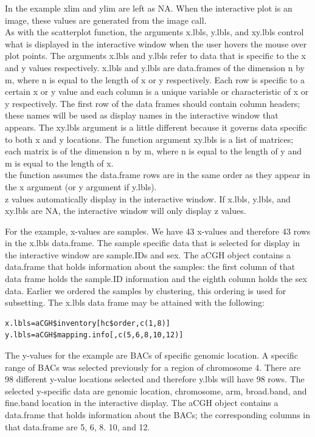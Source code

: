\documentclass[]{article}
\begin{document}
\indent In the example xlim and ylim are left as NA. When the interactive plot is an image, these values are generated from the image call. \\
\indent As with the scatterplot function, the arguments x.lbls, y.lbls, and xy.lbls control what is displayed in the interactive window when the user hovers the mouse over plot points. The arguments x.lbls and y.lbls refer to data that is specific to the x and y values respectively. x.lbls and y.lbls are data.frames of the dimension n by m, where n is equal to the length of x or y respectively. Each row is specific to a certain x or y value and each column is a unique variable or characteristic of x or y respectively.  The first row of the data frames should contain column headers; these names will be used as display names in the interactive window that appears. The xy.lbls argument is a little different because it governs data specific to both x and y locations. The function argument xy.lbls is a list of matrices; each matrix is of the dimension n by m, where n is equal to the length of y and m is equal to the length of x.\\ 

 the function assumes the data.frame rows are in the same order as they appear in the x argument (or y argument if y.lbls). \\
 z values automatically display in the interactive window. If x.lbls, y.lbls, and xy.lbls are NA, the interactive window will only display z values. \newline 

\indent For the example, x-values are samples. We have 43 x-values and therefore 43 rows in the x.lbls data.frame. The sample specific data that is selected for display in the interactive window are sample.IDs and sex. The aCGH object contains a data.frame that holds information about the samples: the first column of that data frame holds the sample.ID information and the eighth column holds the sex data. Earlier we ordered the samples by clustering, this ordering is used for subsetting. The x.lbls data frame may be attained with the following:

\begin{verbatim}
x.lbls=aCGH$inventory[hc$order,c(1,8)]
y.lbls=aCGH$mapping.info[,c(5,6,8,10,12)]
\end{verbatim}


\indent The y-values for the example are BACs of specific genomic location. A specific range of BACs was selected previously for a region of chromosome 4.  There are 98 different y-value locations selected and therefore y.lbls will have 98 rows. The selected y-specific data are genomic location, chromosome, arm, broad.band, and fine.band location in the interactive display. The aCGH object contains a data.frame that holds information about the BACs; the corresponding columns in that data.frame are 5, 6, 8. 10, and 12. \\
\end{document}
